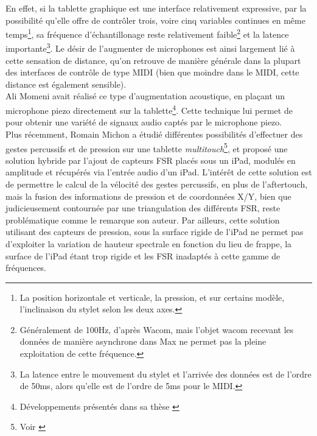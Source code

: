 \indent En effet, si la tablette graphique est une interface relativement expressive, par la possibilité qu'elle offre de contrôler trois, voire cinq variables continues en même temps\footnote{La position horizontale et verticale, la pression, et sur certains modèle, l'inclinaison du stylet selon les deux axes.}, sa fréquence d'échantillonage reste relativement faible\footnote{Généralement de 100Hz, d'après Wacom, mais l'objet wacom recevant les données de manière asynchrone dans Max ne permet pas la pleine exploitation de cette fréquence.} et la latence importante\footnote{La latence entre le mouvement du stylet et l'arrivée des données est de l'ordre de 50ms, alors qu'elle est de l'ordre de 5ms pour le \gls{MIDI}.}. Le désir de l'augmenter de microphones est ainsi largement lié à cette sensation de distance, qu'on retrouve de manière générale dans la plupart des interfaces de contrôle de type \gls{MIDI} (bien que moindre dans le \gls{MIDI}, cette distance est également sensible).\\
\indent Ali Momeni avait réalisé ce type d'augmentation acoustique, en plaçant un microphone piezo directement sur la tablette\footnote{Développements présentés dans sa thèse \cite{momeni_composing_2005}}. Cette technique lui permet de  pour obtenir une variété de signaux audio captés par le microphone piezo.\\
\indent Plus récemment, Romain Michon a étudié différentes possibilités d'effectuer des gestes percussifs et de pression sur une tablette \textit{multitouch}\footnote{Voir \cite{michon_nuance_2016}}, et proposé une solution hybride par l'ajout de capteurs \gls{FSR} placés sous un iPad, modulés en amplitude et récupérés via l'entrée audio d'un iPad. L'intérêt de cette solution est de permettre le calcul de la vélocité des gestes percussifs, en plus de l'aftertouch, mais la fusion des informations de pression et de coordonnées X/Y, bien que judicieusement contournée par une triangulation des différents \gls{FSR}, reste problématique comme le remarque son auteur. Par ailleurs, cette solution utilisant des capteurs de pression, sous la surface rigide de l'iPad ne permet pas d'exploiter la variation de hauteur spectrale en fonction du lieu de frappe, la surface de l'iPad étant trop rigide et les \gls{FSR} inadaptés à cette gamme de fréquences.\\
